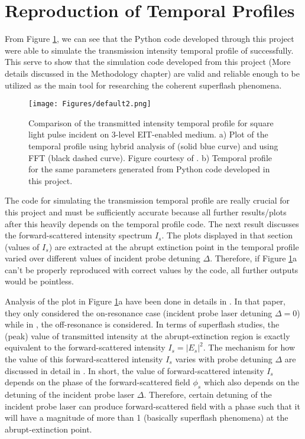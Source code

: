 \section{Reproduction of Temporal Profiles}
From Figure \ref{fig: comparing temporal profile 1}, we can see that the Python code developed through this project were able to simulate the transmission intensity temporal profile of \cite{jeong2010slow} successfully. This serve to show that the simulation code developed from this project (More details discussed in the Methodology chapter) are valid and reliable enough to be utilized as the main tool for researching the coherent superflash phenomena.

\begin{figure}
    \centering
    \texttt{[image: Figures/default2.png]}
    \caption{Comparison of the transmitted intensity temporal profile for square light pulse incident on 3-level EIT-enabled medium. a) Plot of the temporal profile using hybrid analysis of \protect\cite{jeong2010slow} (solid blue curve) and using FFT (black dashed curve). Figure courtesy of \protect\cite{jeong2010slow}. b) Temporal profile for the same parameters generated from Python code developed in this project.}
    \label{fig: comparing temporal profile 1}
\end{figure}

The code for simulating the transmission temporal profile are really crucial for this project and must be sufficiently accurate because all further results/plots after this heavily depends on the temporal profile code. The next result discusses the forward-scattered intensity spectrum $I_{s}$. The plots displayed in that section (values of $I_{s}$) are extracted at the abrupt extinction point in the temporal profile varied over different values of incident probe detuning $\Delta$. Therefore, if Figure \ref{fig: comparing temporal profile 1}a can't be properly reproduced with correct values by the code, all further outputs would be pointless.

Analysis of the plot in Figure \ref{fig: comparing temporal profile 1}a have been done in details in \cite{jeong2010slow}. In that paper, they only considered the on-resonance case (incident probe laser detuning $\Delta = 0$) while in \cite{Kwong2014}, the off-resonance is considered. In terms of superflash studies, the (peak) value of transmitted intensity at the abrupt-extinction region is exactly equivalent to the forward-scattered intensity $I_{s} = |E_{s}|^{2}$. The mechanism for how the value of this forward-scattered intensity $I_{s}$ varies with probe detuning $\Delta$ are discussed in detail in \cite{Chalony2011, Kwong2014, Kwong2017}. In short, the value of forward-scattered intensity $I_{s}$ depends on the phase of the forward-scattered field $\phi_{s}$ which also depends on the detuning of the incident probe laser $\Delta$. Therefore, certain detuning of the incident probe laser can produce forward-scattered field with a phase such that it will have a magnitude of more than 1 (basically superflash phenomena) at the abrupt-extinction point.

